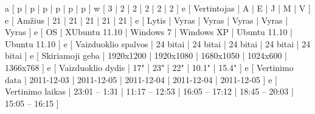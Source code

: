 \xtableu
{
  a [ p | p | p | p | p | p ]
  w [ 3 | 2 | 2 | 2 | 2 | 2 ]
  e [ Vertintojas         | A | E | J | M | V ]
  e [ Amžius              | 21 | 21 | 21 | 21 | 21 ]
  e [ Lytis               | Vyras | Vyras | Vyras | Vyras | Vyras ]
  e [ OS                  | XUbuntu 11.10 | Windows 7 | Windows XP | Ubuntu 11.10 | Ubuntu 11.10 ]
  e [ Vaizduoklio spalvos | 24 bitai | 24 bitai | 24 bitai | 24 bitai | 24 bitai ]
  e [ Skiriamoji geba     | 1920x1200 | 1920x1080 | 1680x1050 | 1024x600 | 1366x768 ]
  e [ Vaizduoklio dydis   | 17" | 23" | 22" | 10.1" | 15.4" ]
  e [ Vertinimo data      | 2011-12-03 | 2011-12-05 | 2011-12-04 | 2011-12-04  | 2011-12-05 ]
  e [ Vertinimo laikas    | 23:01 – 1:31  | 11:17 – 12:53 | 16:05 – 17:12 | 18:45 – 20:03 | 15:05 – 16:15 ]
}
